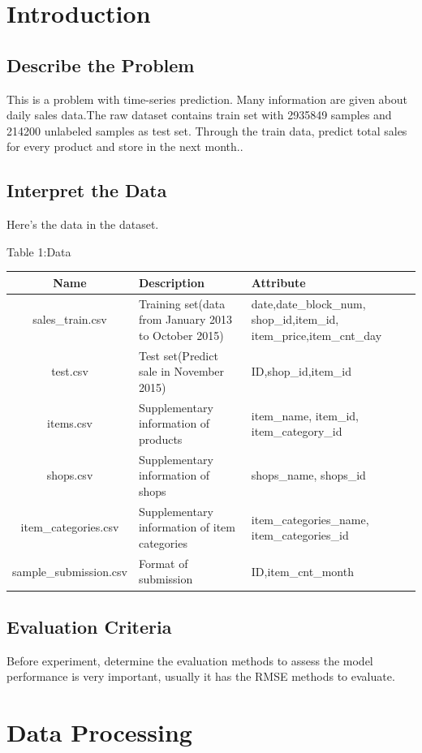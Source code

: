\section{Introduction}\label{sec-intro}
\subsection{Describe the Problem}
\smallskip
This is a problem with time-series prediction. Many information are given about daily sales data.The raw dataset contains train set with 2935849 samples and 214200 unlabeled samples as test set. Through the train data, predict total sales for every product and store in the next month..
\subsection{Interpret the Data}
\smallskip
Here's the data in the dataset.\\
\bigskip
\centerline{\normalsize{Table 1:Data}}
\begin{tabular}{cp{4cm}p{4cm}}
	\hline
	Name&Description&Attribute\\
	\hline
	sales\_train.csv& Training set(data from January 2013 to October 2015)&date,date_block_num, shop_id,item_id, item_price,item_cnt_day\\
	test.csv& Test set(Predict sale in November 2015) & ID,shop_id,item_id\\
	items.csv& Supplementary information of products &item_name, item_id, item_category_id\\
	shops.csv& Supplementary information of shops & shops_name,  shops_id\\
	item_categories.csv& Supplementary information of item categories & item_categories_name, item_categories_id\\
	sample_submission.csv& Format of submission & ID,item_cnt_month\\
	\hline
\end{tabular}
\subsection{Evaluation Criteria}
Before experiment, determine the evaluation methods to assess the model performance is very important, usually it has the RMSE methods to evaluate.
\section{Data Processing} \label{sec-preliminaries}	
